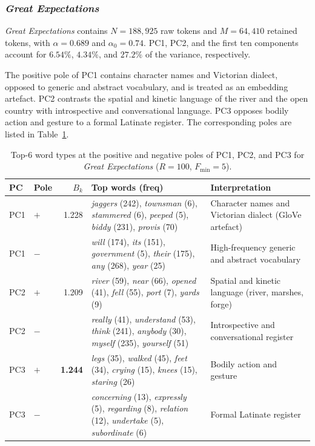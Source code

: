 \documentclass[preprint]{elsarticle}
\begin{document}
\subsubsection{\emph{Great Expectations}}
\label{sec:greatexp}

\emph{Great Expectations} contains $N=188{,}925$ raw tokens and
$M=64{,}410$ retained tokens, with $\alpha=0.689$ and
$\alpha_0=0.74$. PC1, PC2, and the first ten components account for
$6.54\%$, $4.34\%$, and $27.2\%$ of the variance, respectively.

The positive pole of PC1 contains character names and Victorian
dialect, opposed to generic and abstract vocabulary, and is treated as
an embedding artefact. PC2 contrasts the spatial and kinetic language
of the river and the open country with introspective and conversational
language. PC3 opposes bodily action and gesture to a formal Latinate
register. The corresponding poles are listed in
Table~\ref{tab:greatexp_pc}.

\begin{table}[tbp]
\centering
\caption{Top-6 word types at the positive and negative poles
of PC1, PC2, and PC3 for \emph{Great Expectations}
($R=100$, $F_{\min}=5$).}
\label{tab:greatexp_pc}
\small
\setlength{\tabcolsep}{4pt}
\begin{tabular}{llr p{5.4cm} p{4.4cm}}
\toprule
PC & Pole & $B_k$ & Top words (freq) & Interpretation \\
\midrule
PC1 & $+$ & 1.228 &
  \emph{jaggers} (242), \emph{townsman} (6), \emph{stammered} (6),
  \emph{peeped} (5), \emph{biddy} (231), \emph{provis} (70)
  & Character names and Victorian dialect (GloVe artefact) \\
PC1 & $-$ & &
  \emph{will} (174), \emph{its} (151), \emph{government} (5),
  \emph{their} (175), \emph{any} (268), \emph{year} (25)
  & High-frequency generic and abstract vocabulary \\
\midrule
PC2 & $+$ & 1.209 &
  \emph{river} (59), \emph{near} (66), \emph{opened} (41),
  \emph{fell} (55), \emph{port} (7), \emph{yards} (9)
  & Spatial and kinetic language (river, marshes, forge) \\
PC2 & $-$ & &
  \emph{really} (41), \emph{understand} (53), \emph{think} (241),
  \emph{anybody} (30), \emph{myself} (235), \emph{yourself} (51)
  & Introspective and conversational register \\
\midrule
PC3 & $+$ & \textbf{1.244} &
  \emph{legs} (35), \emph{walked} (45), \emph{feet} (34),
  \emph{crying} (15), \emph{knees} (15), \emph{staring} (26)
  & Bodily action and gesture \\
PC3 & $-$ & &
  \emph{concerning} (13), \emph{expressly} (5), \emph{regarding} (8),
  \emph{relation} (12), \emph{undertake} (5), \emph{subordinate} (6)
  & Formal Latinate register \\
\bottomrule
\end{tabular}
\end{table}
\end{document}
